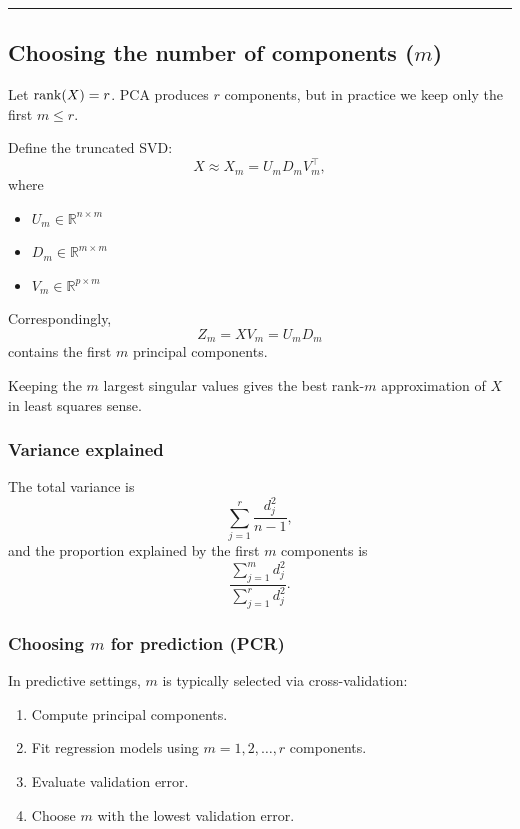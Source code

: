 \documentclass[
  letterpaper,
  DIV=11,
  numbers=noendperiod]{scrreprt}
\providecommand{\tightlist}{%
  \setlength{\itemsep}{0pt}\setlength{\parskip}{0pt}}
\theoremstyle{definition}
\theoremstyle{definition}
\theoremstyle{plain}
\theoremstyle{plain}
\theoremstyle{remark}
\begin{document}
\begin{center}\rule{0.5\linewidth}{0.5pt}\end{center}

\subsection{\texorpdfstring{Choosing the number of components
(\(m\))}{Choosing the number of components (m)}}\label{choosing-the-number-of-components-m}

Let \(\rank(X)=r\). PCA produces \(r\) components, but in practice we
keep only the first \(m \le r\).

Define the truncated SVD: \[
X \approx X_m = U_m D_m V_m^\top,
\] where

\begin{itemize}
\tightlist
\item
  \(U_m \in \mathbb{R}^{n \times m}\)
\item
  \(D_m \in \mathbb{R}^{m \times m}\)
\item
  \(V_m \in \mathbb{R}^{p \times m}\)
\end{itemize}

Correspondingly, \[
Z_m = X V_m = U_m D_m
\] contains the first \(m\) principal components.

Keeping the \(m\) largest singular values gives the best rank-\(m\)
approximation of \(X\) in least squares sense.

\subsubsection{Variance explained}\label{variance-explained}

The total variance is \[
\sum_{j=1}^r \frac{d_j^2}{n-1},
\] and the proportion explained by the first \(m\) components is \[
\frac{\sum_{j=1}^m d_j^2}{\sum_{j=1}^r d_j^2}.
\]

\subsubsection{\texorpdfstring{Choosing \(m\) for prediction
(PCR)}{Choosing m for prediction (PCR)}}\label{choosing-m-for-prediction-pcr}

In predictive settings, \(m\) is typically selected via
cross-validation:

\begin{enumerate}
\def\labelenumi{\arabic{enumi}.}
\tightlist
\item
  Compute principal components.
\item
  Fit regression models using \(m = 1,2,\ldots,r\) components.
\item
  Evaluate validation error.
\item
  Choose \(m\) with the lowest validation error.
\end{enumerate}
\end{document}
